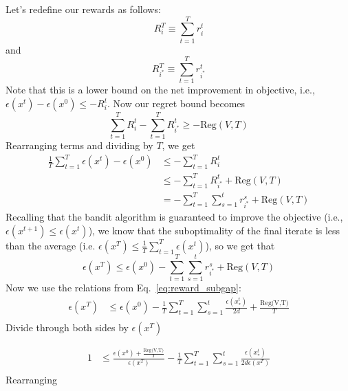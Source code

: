 \documentclass[letterpaper]{article}
\newcommand{\istar}{i^*}
\begin{document}
Let's redefine our rewards as follows:
\begin{equation}
    R_i^T \equiv \sum_{t=1}^T r_i^t
\end{equation}
and
\begin{equation}
    R_{\istar}^T \equiv \sum_{t=1}^T r_{\istar}^t
\end{equation}
Note that this is a lower bound on the net improvement in objective, i.e., $\epsilon(x^t) - \epsilon(x^0) \leq -R_i^t$. Now our regret bound becomes
\begin{equation}
    \sum_{t=1}^T R_i^t -\sum_{t=1}^T R_{\istar}^t \geq -\text{Reg}(V,T)
\end{equation}
Rearranging terms and dividing by $T$, we get
\begin{align}
    \frac{1}{T}\sum_{t=1}^T \epsilon(x^t) - \epsilon(x^0) &\leq -\sum_{t=1}^T R_i^t \\
    &\leq -\sum_{t=1}^T R_{\istar}^t + \text{Reg}(V,T)\\
    &= -\sum_{t=1}^T \sum_{s=1}^t r_{\istar}^s + \text{Reg}(V,T)
\end{align}
Recalling that the bandit algorithm is guaranteed to improve the objective (i.e., $\epsilon(x^{t+1}) \leq \epsilon(x^t)$), we know that the suboptimality of the final iterate is less than the average (i.e. $\epsilon(x^T) \leq \frac{1}{T} \sum_{t=1}^T \epsilon(x^t)$), so we get that
\begin{equation}
    \epsilon(x^T) \leq \epsilon(x^0) -\sum_{t=1}^T \sum_{s=1}^t r_{\istar}^s + \text{Reg}(V,T)
\end{equation}
Now we use the relations from Eq.~\ref{eq:reward_subgap}:
\begin{align}
    \epsilon(x^T) &\leq \epsilon(x^0) - \frac{1}{T}\sum_{t=1}^T \sum_{s=1}^t \frac{\epsilon(x^t_*)}{2d} + \frac{\text{Reg(V,T)}}{T} \\
\end{align}
Divide through both sides by $\epsilon(x^T)$

\begin{align}
    1&\leq \frac{\epsilon(x^0) + \frac{\text{Reg(V,T)}}{T}}{\epsilon(x^T)} - \frac{1}{T}\sum_{t=1}^T \sum_{s=1}^t \frac{\epsilon(x^t_*)}{2d\epsilon(x^T)} \\
\end{align}
Rearranging
\end{document}

